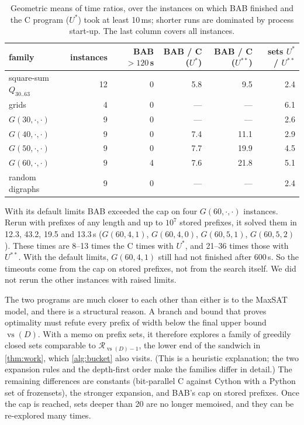 \documentclass[11pt]{article}
\theoremstyle{definition}
\newcommand{\vs}{\operatorname{vs}}
\newcommand{\Rel}{\mathcal{R}}
\begin{document}
\begin{table}[ht]
\centering
\small
\begin{tabular}{lrrrrr}
\toprule
family & instances & BAB $>120$\,s & BAB / C ($U^*$) & BAB / C ($U^{**}$) & sets $U^*$ / $U^{**}$\\
\midrule
square-sum $Q_{30..63}$ & 12 & 0 & 5.8 & 9.5 & 2.4\\
grids & 4 & 0 & --- & --- & 6.1\\
$G(30,\cdot,\cdot)$ & 9 & 0 & --- & --- & 2.6\\
$G(40,\cdot,\cdot)$ & 9 & 0 & 7.4 & 11.1 & 2.9\\
$G(50,\cdot,\cdot)$ & 9 & 0 & 7.7 & 19.9 & 4.5\\
$G(60,\cdot,\cdot)$ & 9 & 4 & 7.6 & 21.8 & 5.1\\
random digraphs & 9 & 0 & --- & --- & 2.4\\
\bottomrule
\end{tabular}
\caption{Geometric means of time ratios, over the instances on which BAB
finished and the C program ($U^*$) took at least 10\,ms; shorter runs are
dominated by process start-up. The last column covers all instances.}\label{tab:babsum}
\end{table}

With its default limits BAB exceeded the cap on four $G(60,\cdot,\cdot)$
instances. Rerun with prefixes of any length and up to $10^7$ stored
prefixes, it solved them in 12.3, 43.2, 19.5 and 13.3\,s ($G(60,4,1)$,
$G(60,4,0)$, $G(60,5,1)$, $G(60,5,2)$). These times are 8--13 times the C
times with $U^*$, and 21--36 times those with $U^{**}$. With the default
limits, $G(60,4,1)$ still had not finished after 600\,s. So the timeouts
come from the cap on stored prefixes, not from the search itself. We did
not rerun the other instances with raised limits.

The two programs are much closer to each other than either is to the
MaxSAT model, and there is a structural reason. A branch and bound that
proves optimality must refute every prefix of width below the final upper
bound $\vs(D)$. With a memo on prefix sets, it therefore explores a family
of greedily closed sets comparable to $\Rel_{\vs(D)-1}$, the lower end of
the sandwich in \cref{thm:work}, which \cref{alg:bucket} also visits. (This
is a heuristic explanation; the two expansion rules and the depth-first
order make the families differ in detail.) The remaining differences are constants (bit-parallel C against
Cython with a Python set of frozensets), the stronger expansion, and BAB's
cap on stored prefixes. Once the cap is reached, sets deeper than 20 are
no longer memoised, and they can be re-explored many times.
\end{document}
